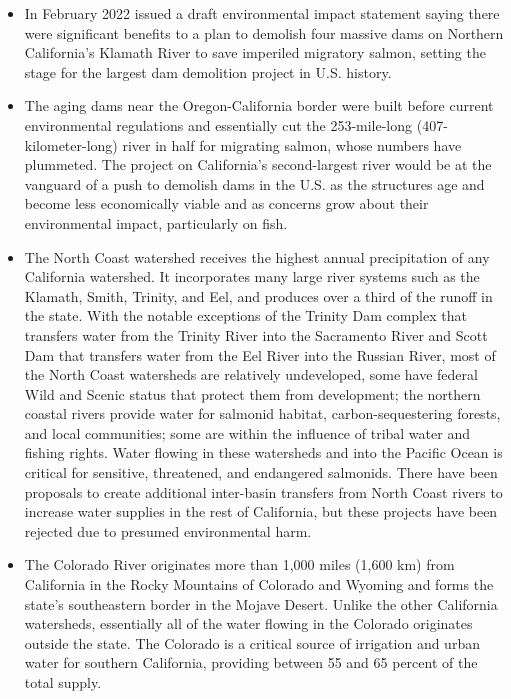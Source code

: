 \documentclass{article}
\begin{document}
\begin{enumerate}
\begin{itemize}
\begin{itemize}
\item In February 2022 issued a draft environmental impact statement saying there were significant benefits to a plan to demolish four massive dams on Northern California’s Klamath River to save imperiled migratory salmon, setting the stage for the largest dam demolition project in U.S. history.
\item The aging dams near the Oregon-California border were built before current environmental regulations and essentially cut the 253-mile-long (407-kilometer-long) river in half for migrating salmon, whose numbers have plummeted. The project on California’s second-largest river would be at the vanguard of a push to demolish dams in the U.S. as the structures age and become less economically viable and as concerns grow about their environmental impact, particularly on fish.
\item The North Coast watershed receives the highest annual precipitation of any California watershed. It incorporates many large river systems such as the Klamath, Smith, Trinity, and Eel, and produces over a third of the runoff in the state. With the notable exceptions of the Trinity Dam complex that transfers water from the Trinity River into the Sacramento River and Scott Dam that transfers water from the Eel River into the Russian River, most of the North Coast watersheds are relatively undeveloped, some have federal Wild and Scenic status that protect them from development; the northern coastal rivers provide water for salmonid habitat, carbon-sequestering forests, and local communities; some are within the influence of tribal water and fishing rights. Water flowing in these watersheds and into the Pacific Ocean is critical for sensitive, threatened, and endangered salmonids. There have been proposals to create additional inter-basin transfers from North Coast rivers to increase water supplies in the rest of California, but these projects have been rejected due to presumed environmental harm.\\

\item The Colorado River originates more than 1,000 miles (1,600 km) from California in the Rocky Mountains of Colorado and Wyoming and forms the state's southeastern border in the Mojave Desert. Unlike the other California watersheds, essentially all of the water flowing in the Colorado originates outside the state. The Colorado is a critical source of irrigation and urban water for southern California, providing between 55 and 65 percent of the total supply.\\


\end{itemize}
\end{itemize}
\end{enumerate}
\end{document}
